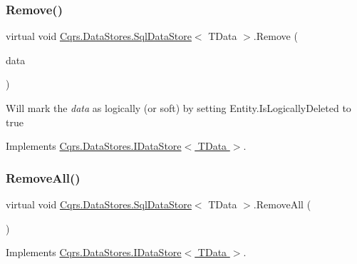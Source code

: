 \subsubsection{\texorpdfstring{Remove()}{Remove()}}
{\footnotesize\ttfamily virtual void \hyperlink{classCqrs_1_1DataStores_1_1SqlDataStore}{Cqrs.\+Data\+Stores.\+Sql\+Data\+Store}$<$ T\+Data $>$.Remove (\begin{DoxyParamCaption}\item[{T\+Data}]{data }\end{DoxyParamCaption})\hspace{0.3cm}{\ttfamily [virtual]}}



Will mark the {\itshape data}  as logically (or soft) by setting Entity.\+Is\+Logically\+Deleted to true 



Implements \hyperlink{interfaceCqrs_1_1DataStores_1_1IDataStore_a7ef540796bbe4257296841590bc23478_a7ef540796bbe4257296841590bc23478}{Cqrs.\+Data\+Stores.\+I\+Data\+Store$<$ T\+Data $>$}.

\mbox{\label{classCqrs_1_1DataStores_1_1SqlDataStore_abb88337dccf3d5372f6b0920d5d26ebd_abb88337dccf3d5372f6b0920d5d26ebd}} 
\subsubsection{\texorpdfstring{Remove\+All()}{RemoveAll()}}
{\footnotesize\ttfamily virtual void \hyperlink{classCqrs_1_1DataStores_1_1SqlDataStore}{Cqrs.\+Data\+Stores.\+Sql\+Data\+Store}$<$ T\+Data $>$.Remove\+All (\begin{DoxyParamCaption}{ }\end{DoxyParamCaption})\hspace{0.3cm}{\ttfamily [virtual]}}



Implements \hyperlink{interfaceCqrs_1_1DataStores_1_1IDataStore_aead8d7a39a717d29af05daf7b64bea94_aead8d7a39a717d29af05daf7b64bea94}{Cqrs.\+Data\+Stores.\+I\+Data\+Store$<$ T\+Data $>$}.

\mbox{\label{classCqrs_1_1DataStores_1_1SqlDataStore_a8f85191cecef92d003620d4064584bb2_a8f85191cecef92d003620d4064584bb2}} 
